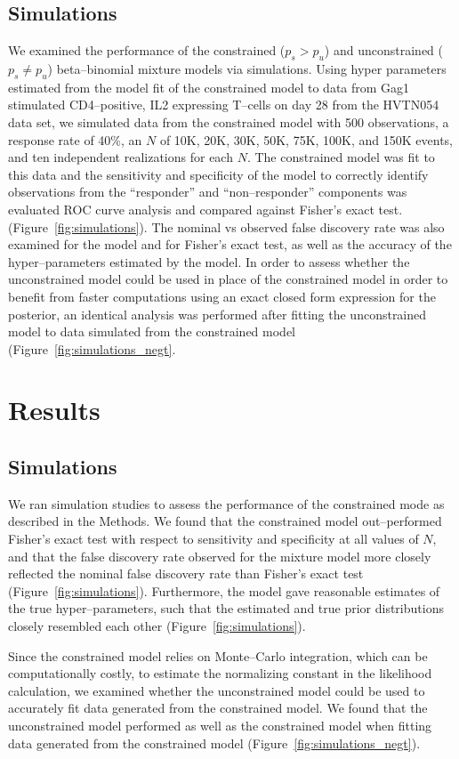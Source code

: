 \documentclass[11pt]{article}
\begin{document}
\subsection{Simulations}
We examined the performance of the constrained ($p_s>p_u$) and unconstrained ($p_s \ne p_u$) beta--binomial mixture models via simulations. Using hyper parameters estimated from the model fit of the constrained model to data from Gag1 stimulated CD4--positive, IL2 expressing T--cells on day 28 from the HVTN054 data set, we simulated data from the constrained model with 500 observations, a response rate of 40\%, an $N$ of 10K, 20K, 30K, 50K, 75K, 100K, and 150K events, and ten independent realizations for each $N$. The constrained model was fit to this data and the sensitivity and specificity of the model to correctly identify observations from the ``responder'' and ``non--responder'' components was evaluated ROC curve analysis and compared against Fisher's exact test. (Figure~\ref{fig:simulations}). The nominal vs observed false discovery rate was also examined for the model and for Fisher's exact test, as well as the accuracy of the hyper--parameters estimated by the model. In order to assess whether the unconstrained model could be used in place of the constrained model in order to benefit from faster computations using an exact closed form expression for the posterior, an identical analysis was performed after fitting the unconstrained model to data simulated from the constrained model (Figure~\ref{fig:simulations_negt}.

\section*{Results}
\subsection*{Simulations}
We ran simulation studies to assess the performance of the constrained mode as described in the Methods. We found that the constrained model out--performed Fisher's exact test with respect to sensitivity and specificity at all values of $N$, and that the false discovery rate observed for the mixture model more closely reflected the nominal false discovery rate than Fisher's exact test (Figure~\ref{fig:simulations}). Furthermore, the model gave reasonable estimates of the true hyper--parameters, such that the estimated and true prior distributions closely resembled each other (Figure~\ref{fig:simulations}).

Since the constrained model relies on Monte--Carlo integration, which can be computationally costly, to estimate the normalizing constant in the likelihood calculation, we examined whether the unconstrained model could be used to accurately fit data generated from the constrained model. We found that the unconstrained model performed as well as the constrained model when fitting data generated from the constrained model (Figure~\ref{fig:simulations_negt}).
\end{document}
